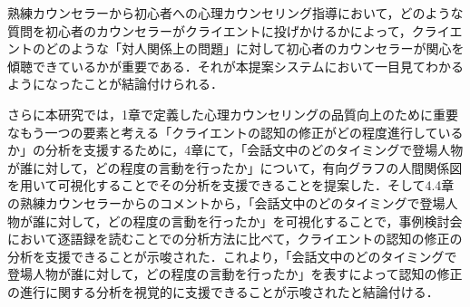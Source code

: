 \documentclass[shuuron]{kuee}
\begin{document}
熟練カウンセラーから初心者への心理カウンセリング指導において，どのような質問を初心者のカウンセラーがクライエントに投げかけるかによって，クライエントのどのような「対人関係上の問題」に対して初心者のカウンセラーが関心を傾聴できているかが重要である．それが本提案システムにおいて一目見てわかるようになったことが結論付けられる．%






さらに本研究では，1章で定義した心理カウンセリングの品質向上のために重要なもう一つの要素と考える「クライエントの認知の修正がどの程度進行しているか」の分析を支援するために，4章にて，「会話文中のどのタイミングで登場人物が誰に対して，どの程度の言動を行ったか」について，有向グラフの人間関係図を用いて可視化することでその分析を支援できることを提案した．そして4.4章の熟練カウンセラーからのコメントから，「会話文中のどのタイミングで登場人物が誰に対して，どの程度の言動を行ったか」を可視化することで，事例検討会において逐語録を読むことでの分析方法に比べて，クライエントの認知の修正の分析を支援できることが示唆された．これより，「会話文中のどのタイミングで登場人物が誰に対して，どの程度の言動を行ったか」を表すによって認知の修正の進行に関する分析を視覚的に支援できることが示唆されたと結論付ける．
\end{document}
